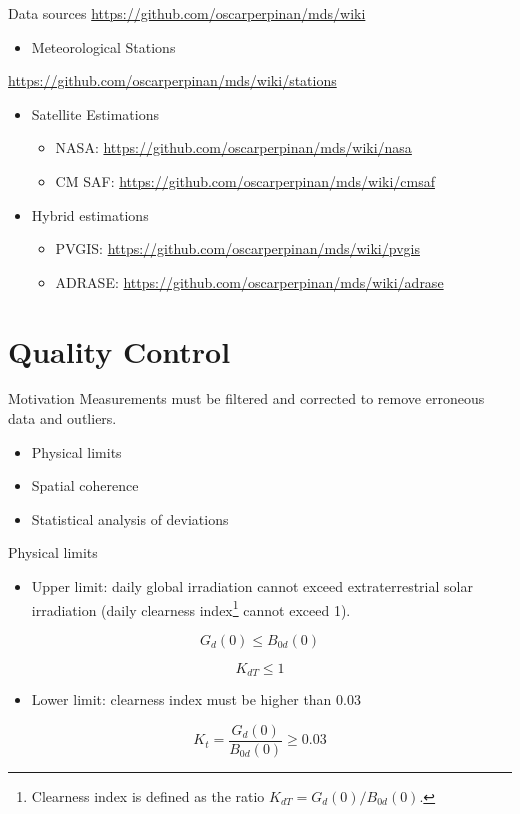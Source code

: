 \documentclass[xcolor={usenames,svgnames,dvipsnames}]{beamer}
\begin{document}
\begin{frame}[label={sec:org8eba65a}]{Data sources}
\url{https://github.com/oscarperpinan/mds/wiki}

\begin{itemize}
\item Meteorological Stations
\end{itemize}
\url{https://github.com/oscarperpinan/mds/wiki/stations}


\begin{itemize}
\item Satellite Estimations
\begin{itemize}
\item NASA: \url{https://github.com/oscarperpinan/mds/wiki/nasa}
\item CM SAF: \url{https://github.com/oscarperpinan/mds/wiki/cmsaf}
\end{itemize}

\item Hybrid estimations
\begin{itemize}
\item PVGIS: \url{https://github.com/oscarperpinan/mds/wiki/pvgis}
\item ADRASE: \url{https://github.com/oscarperpinan/mds/wiki/adrase}
\end{itemize}
\end{itemize}
\end{frame}

\section{Quality Control}
\label{sec:org8ee24e6}
\begin{frame}[label={sec:orgdb26589}]{Motivation}
Measurements must be \alert{filtered} and \alert{corrected} to remove erroneous data and outliers.
\begin{itemize}
\item Physical limits
\item Spatial coherence
\item Statistical analysis of deviations
\end{itemize}
\end{frame}


\begin{frame}[label={sec:orgfd844e9}]{Physical limits}
\begin{itemize}
\item \alert{Upper limit}: daily global irradiation cannot exceed extraterrestrial solar irradiation (daily clearness index\footnote{Clearness index is defined as the ratio \(K_{dT} = G_d(0) / B_{0d}(0)\).} cannot exceed 1).
\end{itemize}
\[
G_d(0) \leq B_{0d}(0)
\]

\[
  K_{dT} \leq 1
\]

\begin{itemize}
\item \alert{Lower limit}: clearness index must be higher than 0.03
\end{itemize}
\[
K_t = \frac{G_d(0)}{B_{0d}(0)} \geq 0.03
\]
\end{frame}
\end{document}
